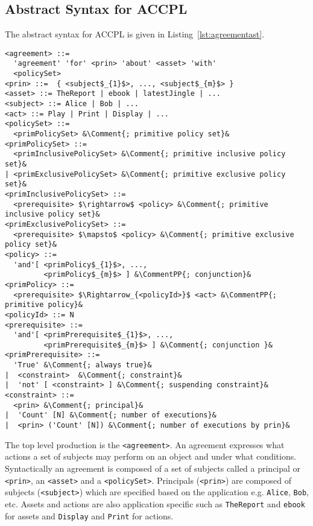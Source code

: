 \documentclass[runningheads,a4paper]{llncs}
\newcommand{\syn}{\texttt}
\begin{document}
\subsection{Abstract Syntax for ACCPL} \label{sec:productionast}

The abstract syntax for \ac{ACCPL} is given in Listing~\ref{lst:agreementast}. 
\newcommand*{\Comment}[1]{\hfill\makebox[5.0cm][l]{#1}}%
\newcommand*{\CommentPP}[1]{\hfill\makebox[3.0cm][l]{#1}}%
\renewcommand{\thelstlisting}{\thesection-\arabic{lstlisting}}%
\lstset{mathescape, language=AST, escapechar=\&} 
\begin{lstlisting}[frame=single, caption={Abstract Syntax for ACCPL},label={lst:agreementast}]
<agreement> ::= 
  'agreement' 'for' <prin> 'about' <asset> 'with'
  <policySet> 
<prin> ::=  { <subject$_{1}$>, ..., <subject$_{m}$> }
<asset> ::= TheReport | ebook | latestJingle | ...
<subject> ::= Alice | Bob | ...
<act> ::= Play | Print | Display | ...
<policySet> ::=  
  <primPolicySet> &\Comment{; primitive policy set}&
<primPolicySet> ::=  
  <primInclusivePolicySet> &\Comment{; primitive inclusive policy set}&
| <primExclusivePolicySet> &\Comment{; primitive exclusive policy set}&
<primInclusivePolicySet> ::=  
  <prerequisite> $\rightarrow$ <policy> &\Comment{; primitive inclusive policy set}&
<primExclusivePolicySet> ::=  
  <prerequisite> $\mapsto$ <policy> &\Comment{; primitive exclusive policy set}&
<policy> ::=  
  'and'[ <primPolicy$_{1}$>, ..., 
         <primPolicy$_{m}$> ] &\CommentPP{; conjunction}&
<primPolicy> ::=  
  <prerequisite> $\Rightarrow_{<policyId>}$ <act> &\CommentPP{; primitive policy}&
<policyId> ::= N 
<prerequisite> ::=    
  'and'[ <primPrerequisite$_{1}$>, ..., 
         <primPrerequisite$_{m}$> ] &\Comment{; conjunction }&
<primPrerequisite> ::=  
  'True' &\Comment{; always true}&
|  <constraint>	 &\Comment{; constraint}&
|  'not' [ <constraint> ] &\Comment{; suspending constraint}&    
<constraint> ::=  
  <prin> &\Comment{; principal}&
|  'Count' [N] &\Comment{; number of executions}&
|  <prin> ('Count' [N]) &\Comment{; number of executions by prin}&     
\end{lstlisting}
The top level production is the \syn{<agreement>}. An agreement expresses what actions a set of subjects may perform on an object and under what conditions. Syntactically an agreement is composed of a set of subjects called a principal or \syn{<prin>}, an \syn{<asset>} and a \syn{<policySet>}. Principals (\syn{<prin>}) are composed of subjects (\syn{<subject>}) which are specified based on the application e.g. \syn{Alice}, \syn{Bob}, etc. Assets and actions are also application specific such as \syn{TheReport} and \syn{ebook} for assets and \syn{Display} and \syn{Print} for actions. 
\end{document}
